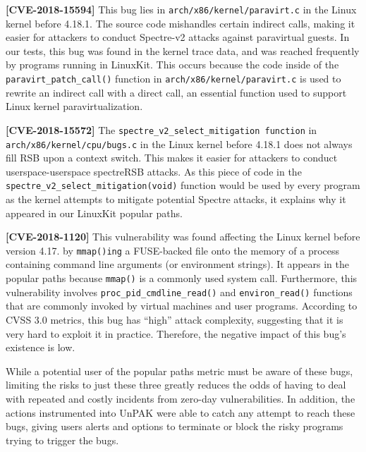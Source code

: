 \noindent
\textbf{[CVE-2018-15594]} 
\newline
This bug lies in \texttt{arch/x86/kernel/paravirt.c} in the Linux kernel before 4.18.1. The source code mishandles certain indirect calls, 
making it easier for attackers to conduct Spectre-v2 attacks against paravirtual guests. 
In our tests, this bug was found in the  kernel trace data, and was reached frequently by programs running in LinuxKit. 
This occurs because the code inside of the \texttt{paravirt\_patch\_call()} function in \texttt{arch/x86/kernel/paravirt.c} is used to rewrite an indirect call with a direct call, 
an essential function used to support Linux kernel paravirtualization.

\noindent
\textbf{[CVE-2018-15572]} 
\newline
The \texttt{spectre\_v2\_select\_mitigation function} in \\
\texttt{arch/x86/kernel/cpu/bugs.c} in the Linux kernel before 4.18.1 does not always fill RSB upon a context switch. 
This makes it easier for attackers to conduct userspace-userspace spectreRSB attacks. 
As this piece of code in the \\
\texttt{spectre\_v2\_select\_mitigation(void)} function would be used by every program as the kernel attempts to mitigate potential Spectre attacks, 
it explains why it appeared in our LinuxKit popular paths. 

\noindent
\textbf{[CVE-2018-1120]} 
\newline
This vulnerability was found affecting the Linux kernel before version 4.17. 
by \texttt{mmap()ing} a FUSE-backed file onto the memory of a process containing command line arguments (or environment strings). 
It appears in the popular paths because \texttt{mmap()} is a commonly used system call. 
Furthermore, this vulnerability involves \texttt{proc\_pid\_cmdline\_read()} and \texttt{environ\_read()} functions  that are commonly invoked by virtual machines and user programs. 
According to CVSS 3.0 \cite{CVSS} metrics, this bug has ``high'' attack complexity, suggesting that it is very hard to exploit it in practice. 
Therefore, the negative impact of this bug’s existence is low. 

While a potential user of the popular paths metric must be aware of these bugs, 
limiting the risks to just these three greatly reduces the odds of having to deal with repeated and costly incidents from zero-day vulnerabilities. 
In addition, the actions instrumented into UnPAK were able to catch any attempt to reach these bugs, giving users alerts and options to terminate or block the risky programs trying to trigger the bugs. 

